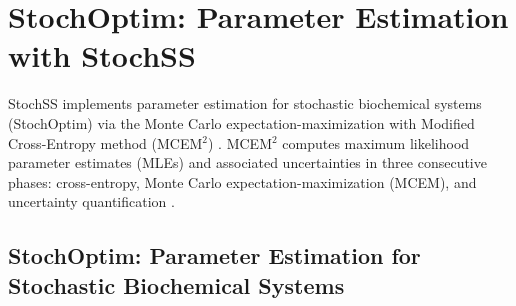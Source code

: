 \chapter{StochOptim: Parameter Estimation with StochSS}
\label{chapter-stochoptim}

StochSS implements parameter estimation for stochastic biochemical systems (StochOptim) via the Monte Carlo expectation-maximization with Modified Cross-Entropy method (MCEM$^2$) \cite{bernie}.
MCEM$^2$ computes maximum likelihood parameter estimates (MLEs) and associated uncertainties in three consecutive phases: cross-entropy, Monte Carlo expectation-maximization (MCEM), and uncertainty quantification \cite{bernie}.

\section{StochOptim: Parameter Estimation for Stochastic Biochemical Systems}

